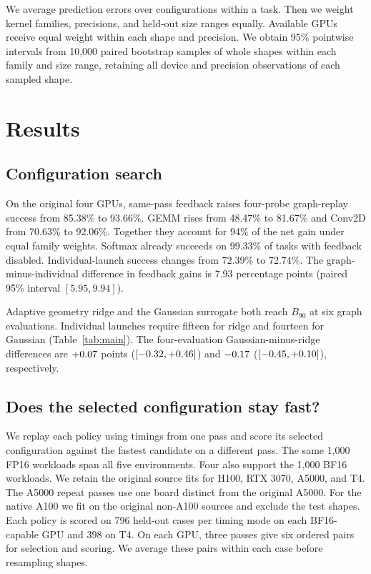 \documentclass[conference]{IEEEtran}
\begin{document}
We average prediction errors over configurations within a task. Then we
weight kernel families, precisions, and held-out size ranges equally.
Available GPUs receive equal weight within each shape and precision.
We obtain 95\% pointwise intervals from 10,000 paired bootstrap samples of whole
shapes within each family and size range, retaining all device and
precision observations of each sampled shape.

\section{Results}
\subsection{Configuration search}
On the original four GPUs, same-pass feedback raises four-probe
graph-replay success from 85.38\%
to 93.66\%. GEMM rises from 48.47\% to 81.67\% and Conv2D from 70.63\%
to 92.06\%. Together they account for 94\% of
the net gain under equal family weights. Softmax already succeeds on
99.33\% of tasks with feedback disabled. Individual-launch success
changes from 72.39\% to 72.74\%. The graph-minus-individual difference
in feedback gains is 7.93 percentage points (paired 95\% interval
$[5.95,9.94]$).

Adaptive geometry ridge and the Gaussian surrogate both reach $B_{90}$ at
six graph evaluations. Individual launches require fifteen for ridge and
fourteen for Gaussian (Table~\ref{tab:main}).
The four-evaluation Gaussian-minus-ridge differences are
$+0.07$ points ($[-0.32,+0.46]$) and $-0.17$
($[-0.45,+0.10]$), respectively.

\subsection{Does the selected configuration stay fast?}
We replay each policy using timings from one pass and score its selected
configuration against the fastest candidate on a different pass. The
same 1,000 FP16 workloads span all five environments. Four also support
the 1,000 BF16 workloads. We retain the original source fits for H100,
RTX 3070, A5000, and T4. The A5000 repeat passes use one board distinct
from the original A5000. For the native A100 we fit on the original
non-A100 sources and exclude the test shapes. Each policy is scored on
796 held-out cases per timing mode on each BF16-capable GPU and 398 on
T4. On each GPU, three passes give six ordered pairs for selection and
scoring. We average these pairs within each case before resampling shapes.
\end{document}
